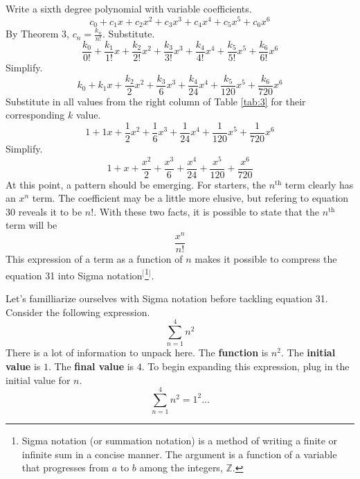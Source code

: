\documentclass{article}
\begin{document}
Write a sixth degree polynomial with variable coefficients.
\begin{equation*}
    c_0+c_1x+c_2x^2+c_3x^3+c_4x^4+c_5x^5+c_6x^6
\end{equation*}
By Theorem 3, $c_n=\frac{k_n}{n!}$. Substitute.
\begin{equation}
    \frac{k_0}{0!}+\frac{k_1}{1!}x+\frac{k_2}{2!}x^2+\frac{k_3}{3!}x^3+\frac{k_4}{4!}x^4+\frac{k_5}{5!}x^5+\frac{k_6}{6!}x^6
\end{equation}
Simplify.
\begin{equation*}
    k_0+k_1x+\frac{k_2}{2}x^2+\frac{k_3}{6}x^3+\frac{k_4}{24}x^4+\frac{k_5}{120}x^5+\frac{k_6}{720}x^6
\end{equation*}
Substitute in all values from the right column of Table \ref{tab:3} for their corresponding $k$ value.
\begin{equation*}
    1+1x+\frac{1}{2}x^2+\frac{1}{6}x^3+\frac{1}{24}x^4+\frac{1}{120}x^5+\frac{1}{720}x^6
\end{equation*}
Simplify.
\begin{equation}
    1+x+\frac{x^2}{2}+\frac{x^3}{6}+\frac{x^4}{24}+\frac{x^5}{120}+\frac{x^6}{720}
\end{equation}
At this point, a pattern should be emerging. For starters, the $n^\text{th}$ term clearly has an $x^n$ term. The coefficient may be a little more elusive, but refering to equation 30 reveals it to be $n!$. With these two facts, it is possible to state that the $n^\text{th}$ term will be
\begin{equation*}
    \frac{x^n}{n!}
\end{equation*}
This expression of a term as a function of $n$ makes it possible to compress the equation 31 into Sigma notation$^[$\footnote{Sigma notation (or summation notation) is a method of writing a finite or infinite sum in a concise manner. The argument is a function of a variable that progresses from $a$ to $b$ among the integers, $\mathbb{Z}$.}$^]$.\par
Let's familliarize ourselves with Sigma notation before tackling equation 31. Consider the following expression.
\begin{equation*}
    \sum_{n=1}^4 n^2
\end{equation*}
There is a lot of information to unpack here. The \textbf{function} is $n^2$. The \textbf{initial value} is $1$. The \textbf{final value} is $4$. To begin expanding this expression, plug in the initial value for $n$.
\begin{equation*}
    \sum_{n=1}^4 n^2 = 1^2\ldots
\end{equation*}
\end{document}
